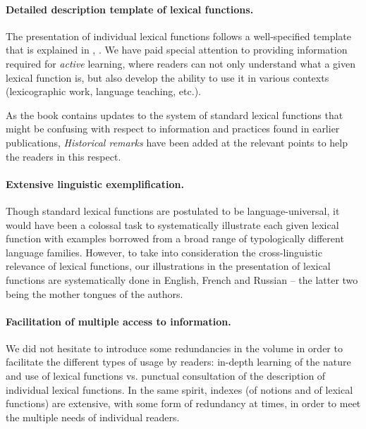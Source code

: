 \paragraph*{Detailed description template of lexical functions.}

The presentation of individual lexical functions follows a well-specified template that is explained in , . We have paid special attention to providing information required for \emph{active} learning, where readers can not only understand what a given lexical function is, but also develop the ability to use it in various contexts (lexicographic work, language teaching, etc.).

As the book contains updates to the system of standard lexical functions that might be confusing with respect to information and practices found in earlier publications, \textit{Historical remarks} have been added at the relevant points to help the readers in this respect.

\paragraph*{Extensive linguistic exemplification.}

Though standard lexical functions are postulated to be language-universal, it would have been a colossal task to systematically illustrate each given lexical function with examples borrowed from a broad range of typologically different language families. However, to take into consideration the cross-linguistic relevance of lexical functions, our illustrations in the presentation of lexical functions are systematically done in English, French and Russian -- the latter two being the mother tongues of the authors.

\paragraph*{Facilitation of multiple access to information.}

We did not hesitate to introduce some redundancies in the volume in order to facilitate the different types of usage by readers: in-depth learning of the nature and use of lexical functions vs. punctual consultation of the description of individual lexical functions. In the same spirit, indexes (of notions and of lexical functions) are extensive, with some form of redundancy at times, in order to meet the multiple needs of individual readers.

